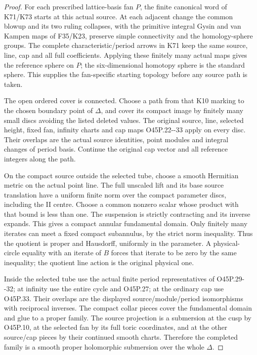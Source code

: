 \begin{proof}
For each prescribed lattice-basis fan \(P\), the finite
canonical word of K71/K73 starts at this actual source.
At each adjacent change the common blowup and its two
ruling collapses, with the primitive integral Gysin
and van Kampen maps of F35/K23, preserve simple
connectivity and the homology-sphere groups. The
complete characteristic/period arrows in K71 keep
the same source, line, cap and all full coefficients.
Applying these finitely many actual maps gives the
reference sphere on \(P\); the six-dimensional
homotopy sphere is the standard sphere. This supplies
the fan-specific starting topology before any source
path is taken.

The open ordered cover is connected. Choose a path
from that K10 marking to the chosen boundary point
of \(\Delta\), and cover its compact image by finitely
many small discs avoiding the listed deleted values.
The original source, line, selected height, fixed
fan, infinity charts and cap maps O45P.22-\/-33 apply
on every disc. Their overlaps are the actual source
identities, point modules and integral changes of
period basis. Continue the original cap vector and
all reference integers along the path.

On the compact source outside the selected tube,
choose a smooth Hermitian metric on the actual
point line. The full unscaled lift and its base
source translation have a uniform finite norm over
the compact parameter discs, including the II centre.
Choose a common nonzero scalar whose product with
that bound is less than one. The suspension is
strictly contracting and its inverse expands.
This gives a compact annular fundamental domain.
Only finitely many iterates can meet a fixed compact
subannulus, by the strict norm inequality. Thus the
quotient is proper and Hausdorff, uniformly in the
parameter. A physical-circle equality with an iterate
of \(B\) forces that iterate to be zero by the same
inequality; the quotient line action is the original
physical one.

Inside the selected tube use the actual finite
period representatives of O45P.29-\/-32; at infinity
use the entire cycle and O45P.27; at the ordinary
cap use O45P.33. Their overlaps are the displayed
source/module/period isomorphisms with reciprocal
inverses. The compact collar pieces cover the
fundamental domain and glue to a proper family.
The source projection is a submersion at the cusp
by O45P.10, at the selected fan by its full toric
coordinates, and at the other source/cap pieces
by their continued smooth charts. Therefore the
completed family is a smooth proper holomorphic
submersion over the whole \(\Delta\).


\end{proof}
